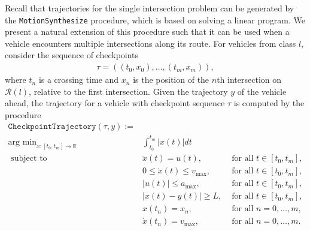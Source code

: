 \documentclass{article}
\theoremstyle{definition}
\theoremstyle{plain}
\begin{document}
Recall that trajectories for the single intersection problem can be generated by
the \texttt{MotionSynthesize} procedure, which is based on solving a linear
program.
%
%
We present a natural extension of this procedure such that it can be used when a
vehicle encounters multiple intersections along its route. For vehicles from
class $l$, consider the sequence of checkpoints
%
\begin{align*}
  \tau = ((t_{0}, x_{0}), \dots, (t_{m}, x_{m})) ,
\end{align*}
where $t_{n}$ is a crossing time and $x_{n}$ is the position of the $n$th
intersection on $\mathcal{R}(l)$, relative to the first intersection.
%
Given the trajectory $y$ of the vehicle ahead, the trajectory for a vehicle with
checkpoint sequence $\tau$ is computed by the procedure
%
\begin{align*}
  \texttt{CheckpointTrajectory}(\tau, y) := \\
  \text{arg min}_{x : [t_{0}, t_{m}] \rightarrow \mathbb{R}} \; &\int_{t_{0}}^{t_{m}} |x(t)|dt \\
  \text{ subject to } \; & \ddot{x}(t) = u(t) ,& \text{ for all } t \in [t_{0}, t_{m}] , \\
  & 0 \leq \dot{x}(t) \leq v_{\max} ,& \text{ for all } t \in [t_{0}, t_{m}] , \\
  & |u(t)| \leq a_{\max} ,& \text{ for all } t \in [t_{0}, t_{m}] , \\
  & |x(t) - y(t)| \geq L ,& \text{ for all } t \in [t_{0}, t_{m}] , \\
  & x(t_{n}) = x_{n} ,& \text{ for all } n = 0, \dots, m , \\
  & \dot{x}(t_{n}) = v_{\max} ,& \text{ for all } n = 0, \dots, m .
\end{align*}
\end{document}
